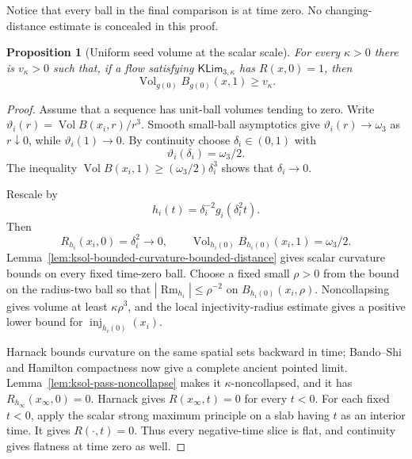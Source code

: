 \documentclass[10pt]{coll-l}
\newcommand{\inj}{\operatorname{inj}}
\newtheorem{proposition}[theorem]{Proposition}
\theoremstyle{definition}
\theoremstyle{remark}
\numberwithin{section}{chapter}
\numberwithin{equation}{chapter}
\newcommand{\Rm}{\operatorname{Rm}}
\newcommand{\Vol}{\operatorname{Vol}}
\begin{document}
Notice that every ball in the final comparison is at time zero.  No
changing-distance estimate is concealed in this proof.

\begin{proposition}[Uniform seed volume at the scalar scale]
\label{prop:ksol-seed-volume}
For every $\kappa>0$ there is $v_\kappa>0$ such that, if a flow satisfying
$\mathsf{KLim}_{3,\kappa}$ has $R(x,0)=1$, then
\begin{equation}
                     \Vol_{g(0)}B_{g(0)}(x,1)\geq v_\kappa.    \label{eq:ksol-seed-volume}
\end{equation}
\end{proposition}

\begin{proof}
Assume that a sequence has unit-ball volumes tending to zero.  Write
\(\vartheta_i(r)=\Vol B(x_i,r)/r^3\).  Smooth small-ball asymptotics give
$\vartheta_i(r)\to\omega_3$ as $r\downarrow0$, while
$\vartheta_i(1)\to0$.  By continuity choose $\delta_i\in(0,1)$ with
\begin{equation}
                     \vartheta_i(\delta_i)=\omega_3/2. \label{eq:ksol-half-Euclidean-scale}
\end{equation}
The inequality
$\Vol B(x_i,1)\geq(\omega_3/2)\delta_i^3$ shows that
$\delta_i\to0$.

Rescale by
\begin{equation}
                        h_i(t)=\delta_i^{-2}g_i(\delta_i^2t).   \label{eq:ksol-seed-rescaling}
\end{equation}
Then
\begin{equation}
 R_{h_i}(x_i,0)=\delta_i^2\to0,
 \qquad \Vol_{h_i(0)}B_{h_i(0)}(x_i,1)=\omega_3/2.     \label{eq:ksol-seed-rescaled-data}
\end{equation}
Lemma~\ref{lem:ksol-bounded-curvature-bounded-distance} gives scalar
curvature bounds on every fixed time-zero ball.  Choose a fixed small
$\rho>0$ from the bound on the radius-two ball so that
$|\Rm_{h_i}|\leq\rho^{-2}$ on $B_{h_i(0)}(x_i,\rho)$.
Noncollapsing gives volume at least $\kappa\rho^3$, and the local
injectivity-radius estimate gives a positive lower bound for
$\inj_{h_i(0)}(x_i)$.

Harnack bounds curvature on the same spatial sets backward in time;
Bando--Shi and Hamilton compactness now give a complete ancient pointed
limit.  Lemma~\ref{lem:ksol-pass-noncollapse} makes it
$\kappa$-noncollapsed, and it has
$R_{h_\infty}(x_\infty,0)=0$.  Harnack gives
$R(x_\infty,t)=0$ for every $t<0$.  For each fixed $t<0$, apply the scalar
strong maximum principle on a slab having $t$ as an interior time.  It
gives $R(\cdot,t)=0$.  Thus every negative-time slice is flat, and
continuity gives flatness at time zero as well.


\end{proof}
\end{document}
